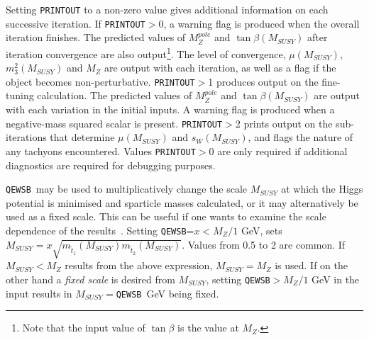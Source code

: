 \documentclass[]{article}
\def\code#1{\small{\tt #1}\normalsize}
\begin{document}
Setting \code{PRINTOUT} to a non-zero value gives additional information
on 
each successive iteration. If \code{PRINTOUT}$>$0, a warning flag is
produced when the overall iteration 
finishes. The predicted values of $M_Z^{pole}$ and $\tan \beta(M_{SUSY})$ after
iteration convergence
are also output\footnote{Note that the input value of $\tan \beta$ is the
value at $M_Z$.}. The level of convergence, $\mu(M_{SUSY})$, $m_3^2(M_{SUSY})$ and $M_Z$
are output with each iteration, as well as a flag if the object becomes
non-perturbative. 
\code{PRINTOUT}$>$1 produces output on the fine-tuning calculation. The
predicted values of $M_Z^{pole}$ and $\tan \beta(M_{SUSY})$ are output with each
variation 
in the initial inputs. A warning flag is produced when a
negative-mass squared scalar is present.
\code{PRINTOUT}$>$2 prints output on the sub-iterations that determine
$\mu(M_{SUSY})$ and $s_W(M_{SUSY})$, and flags the nature of any tachyons
encountered. Values \code{PRINTOUT}$>$0 are only required
if additional diagnostics are required for debugging purposes.

\code{QEWSB}~may be used to multiplicatively change the scale $M_{SUSY}$ at which 
the Higgs potential is minimised and sparticle masses calculated, or it may
alternatively be used as a fixed scale.
This can be useful if one wants to examine
the scale dependence of the results~\cite{scaledep}. Setting
\code{QEWSB}=$x<M_Z/1$ GeV,
sets $M_{SUSY} = x\sqrt{m_{\tilde t_1}(M_{SUSY}) m_{\tilde t_2}(M_{SUSY})}$. Values from
0.5 to 2 are common. If $M_{SUSY}<M_Z$ results from the above expression, $M_{SUSY}=M_Z$
is used. If on the other hand a {\em fixed scale}\/ is desired from $M_{SUSY}$, 
setting \code{QEWSB}$>M_Z/1$ GeV in the input results in 
$M_{SUSY}=$\code{QEWSB}~GeV being fixed.
\end{document}
